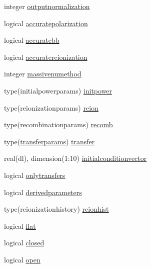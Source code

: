 \begin{DoxyCompactItemize}
\item 
integer \mbox{\hyperlink{structmodelparams_1_1cambparams_a78c29a187435a9e78a28e6f63f279336}{outputnormalization}}
\item 
logical \mbox{\hyperlink{structmodelparams_1_1cambparams_a7f12f52d3bfbc8053018ceef0edb3bbb}{accuratepolarization}}
\item 
logical \mbox{\hyperlink{structmodelparams_1_1cambparams_a676f0dd23f88b2f27e6a42dcf0b4f537}{accuratebb}}
\item 
logical \mbox{\hyperlink{structmodelparams_1_1cambparams_ae9d7c9467ae4ecdcd49ca5665b4e7338}{accuratereionization}}
\item 
integer \mbox{\hyperlink{structmodelparams_1_1cambparams_a8c070c903b7598f5d14bd0950121451e}{massivenumethod}}
\item 
type(initialpowerparams) \mbox{\hyperlink{structmodelparams_1_1cambparams_aba410417a36625e888116badf56c9d94}{initpower}}
\item 
type(reionizationparams) \mbox{\hyperlink{structmodelparams_1_1cambparams_a2cdbbda2727aee8350d632906bfa081d}{reion}}
\item 
type(recombinationparams) \mbox{\hyperlink{structmodelparams_1_1cambparams_a2883eb7b54f398c679429c14b84868ee}{recomb}}
\item 
type(\mbox{\hyperlink{structmodelparams_1_1transferparams}{transferparams}}) \mbox{\hyperlink{structmodelparams_1_1cambparams_addad9d58e22a47d5e73f8d44ef9ec737}{transfer}}
\item 
real(dl), dimension(1\+:10) \mbox{\hyperlink{structmodelparams_1_1cambparams_a6e3d9f8f60709ee982e7c5aa24328cd4}{initialconditionvector}}
\item 
logical \mbox{\hyperlink{structmodelparams_1_1cambparams_a9d235225c25519c8074e167157bc0b00}{onlytransfers}}
\item 
logical \mbox{\hyperlink{structmodelparams_1_1cambparams_a0f2cf67fe7507df4728c48b7e8fd6aef}{derivedparameters}}
\item 
type(reionizationhistory) \mbox{\hyperlink{structmodelparams_1_1cambparams_a7b8ea50f9b0279789aeb7dbc3008df38}{reionhist}}
\item 
logical \mbox{\hyperlink{structmodelparams_1_1cambparams_acf97a62d89a4c5e0425d72afb7fd1c4a}{flat}}
\item 
logical \mbox{\hyperlink{structmodelparams_1_1cambparams_a386347285aa1390274de7fbf6c9d27f6}{closed}}
\item 
logical \mbox{\hyperlink{structmodelparams_1_1cambparams_a4f5b84223b22d6932ca4a4c7a5613ea0}{open}}

\end{DoxyCompactItemize}
